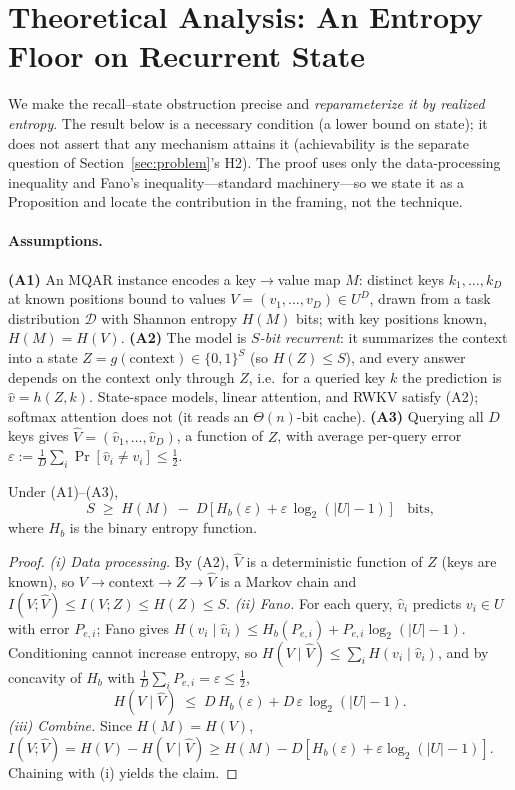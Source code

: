 \section{Theoretical Analysis: An Entropy Floor on Recurrent State}
\label{sec:theory}

We make the recall--state obstruction precise and \emph{reparameterize it by realized entropy}.
The result below is a necessary condition (a lower bound on state); it does not assert that any
mechanism attains it (achievability is the separate question of Section~\ref{sec:problem}'s H2).
The proof uses only the data-processing inequality and Fano's inequality---standard machinery---so
we state it as a Proposition and locate the contribution in the framing, not the technique.

\paragraph{Assumptions.}
\textbf{(A1)} An MQAR instance encodes a key$\rightarrow$value map $M$: distinct keys
$k_1,\dots,k_D$ at known positions bound to values $V=(v_1,\dots,v_D)\in U^D$, drawn from a task
distribution $\mathcal{D}$ with Shannon entropy $H(M)$ bits; with key positions known,
$H(M)=H(V)$. \textbf{(A2)} The model is \emph{$S$-bit recurrent}: it summarizes the context into a
state $Z=g(\text{context})\in\{0,1\}^S$ (so $H(Z)\le S$), and every answer depends on the context
only through $Z$, i.e.\ for a queried key $k$ the prediction is $\hat v=h(Z,k)$. State-space models,
linear attention, and RWKV satisfy (A2); softmax attention does not (it reads an $\Theta(n)$-bit
cache). \textbf{(A3)} Querying all $D$ keys gives $\hat V=(\hat v_1,\dots,\hat v_D)$, a function of
$Z$, with average per-query error $\varepsilon:=\tfrac1D\sum_i \Pr[\hat v_i\neq v_i]\le \tfrac12$.

\begin{proposition}
\label{prop:floor}
Under \textnormal{(A1)--(A3)},
\[
  S \;\ge\; H(M) \;-\; D\,\bigl[\,H_b(\varepsilon) + \varepsilon\,\log_2(|U|-1)\,\bigr]\quad\text{bits,}
\]
where $H_b$ is the binary entropy function.
\end{proposition}

\begin{proof}
\emph{(i) Data processing.} By (A2), $\hat V$ is a deterministic function of $Z$ (keys are known),
so $V \to \text{context} \to Z \to \hat V$ is a Markov chain and
$I(V;\hat V)\le I(V;Z)\le H(Z)\le S$.
\emph{(ii) Fano.} For each query, $\hat v_i$ predicts $v_i\in U$ with error $P_{e,i}$; Fano gives
$H(v_i\mid \hat v_i)\le H_b(P_{e,i})+P_{e,i}\log_2(|U|-1)$. Conditioning cannot increase entropy, so
$H(V\mid\hat V)\le\sum_i H(v_i\mid\hat v_i)$, and by concavity of $H_b$ with
$\tfrac1D\sum_i P_{e,i}=\varepsilon\le\tfrac12$,
\[
  H(V\mid \hat V)\;\le\; D\,H_b(\varepsilon) + D\,\varepsilon\,\log_2(|U|-1).
\]
\emph{(iii) Combine.} Since $H(M)=H(V)$, $I(V;\hat V)=H(V)-H(V\mid\hat V)\ge H(M)-D[H_b(\varepsilon)+\varepsilon\log_2(|U|-1)]$.
Chaining with (i) yields the claim.
\end{proof}

